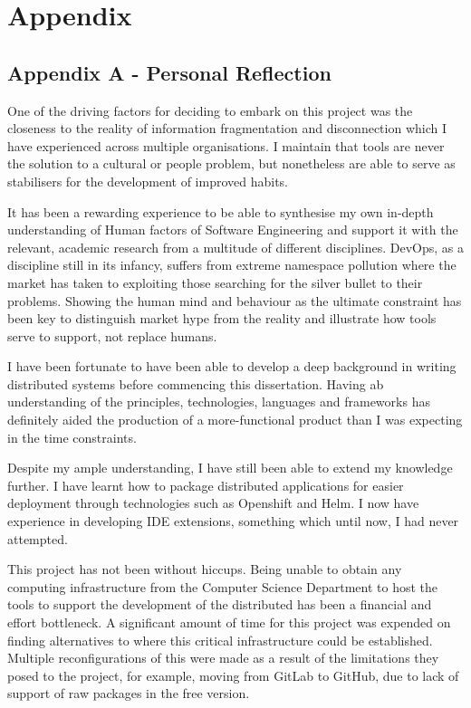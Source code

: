 \chapter{Appendix}

\section{Appendix A - Personal Reflection}

One of the driving factors for deciding to embark on this project was the closeness to the reality of information fragmentation and disconnection which I have experienced across multiple organisations. I maintain that tools are never the solution to a cultural or people problem, but nonetheless are able to serve as stabilisers for the development of improved habits.

It has been a rewarding experience to be able to synthesise my own in-depth understanding of Human factors of Software Engineering and support it with the relevant, academic research from a multitude of different disciplines. DevOps, as a discipline still in its infancy, suffers from extreme namespace pollution where the market has taken to exploiting those searching for the silver bullet to their problems. Showing the human mind and behaviour as the ultimate constraint has been key to distinguish market hype from the reality and illustrate how tools serve to support, not replace humans.

I have been fortunate to have been able to develop a deep background in writing distributed systems before commencing this dissertation. Having ab understanding of the principles, technologies, languages and frameworks has definitely aided the production of a more-functional product than I was expecting in the time constraints.

Despite my ample understanding, I have still been able to extend my knowledge further. I have learnt how to package distributed applications for easier deployment through technologies such as Openshift and Helm. I now have experience in developing IDE extensions, something which until now, I had never attempted. 

This project has not been without hiccups. Being unable to obtain any computing infrastructure from the Computer Science Department to host the tools to support the development of the distributed has been a financial and effort bottleneck. A significant amount of time for this project was expended on finding alternatives to where this critical infrastructure could be established. Multiple reconfigurations of this were made as a result of the limitations they posed to the project, for example, moving from GitLab to GitHub, due to lack of support of raw packages in the free version.

